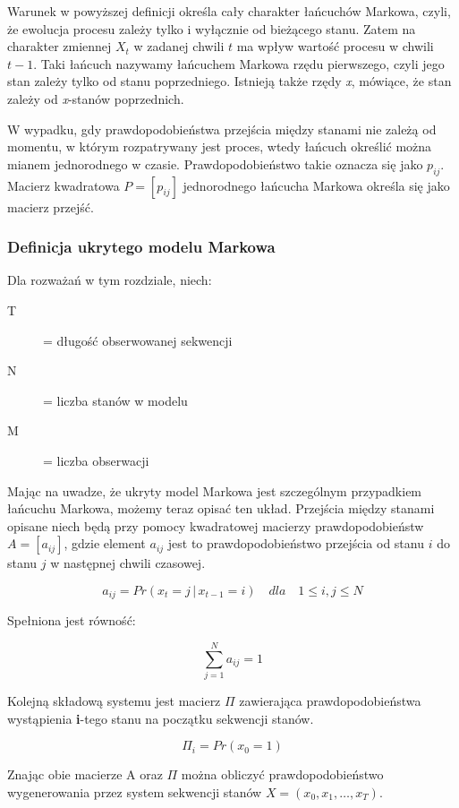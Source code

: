 Warunek w powyższej definicji określa cały charakter łańcuchów Markowa, czyli, że ewolucja procesu zależy tylko i wyłącznie od bieżącego stanu. Zatem na charakter zmiennej $X_t$ w zadanej chwili $t$ ma wpływ wartość procesu w chwili $t - 1$. Taki łańcuch nazywamy łańcuchem Markowa rzędu pierwszego, czyli jego stan zależy tylko od stanu poprzedniego. Istnieją także rzędy \textit{x}, mówiące, że stan zależy od \textit{x}-stanów poprzednich.

W wypadku, gdy prawdopodobieństwa przejścia między stanami nie zależą od momentu, w którym rozpatrywany jest proces, wtedy łańcuch określić można mianem jednorodnego w czasie. Prawdopodobieństwo takie oznacza się jako $p_{ij}$. Macierz kwadratowa $P=[p_{ij}]$ jednorodnego łańcucha Markowa określa się jako macierz przejść.

\subsubsection{Definicja ukrytego modelu Markowa}

Dla rozważań w tym rozdziale, niech:

\begin{description}
  \item[T] = długość obserwowanej sekwencji
  \item[N] = liczba stanów w modelu
  \item[M] = liczba obserwacji
\end{description}

Mając na uwadze, że ukryty model Markowa jest szczególnym przypadkiem łańcuchu Markowa, możemy teraz opisać ten układ. Przejścia między stanami opisane niech będą przy pomocy kwadratowej macierzy prawdopodobieństw $A=[a_{ij}]$, gdzie element $a_{ij}$ jest to prawdopodobieństwo przejścia od stanu $i$ do stanu $j$ w następnej chwili czasowej.

$$ a_{ij}=Pr(x_{t}=j\,|\,x_{t-1}=i) \quad dla \quad 1 \leq i,j \leq N $$

Spełniona jest równość:

$$ \sum_{j=1}^{N} a_{ij} = 1 $$

\newpage

Kolejną składową systemu jest macierz $\Pi$ zawierająca prawdopodobieństwa wystąpienia \textbf{i}-tego stanu na początku sekwencji stanów.

$$ \Pi_{i} = Pr(x_{0}=1) $$

Znając obie macierze A oraz $\Pi$ można obliczyć prawdopodobieństwo wygenerowania przez system sekwencji stanów $X=(x_{0},x_{1}, \dots, x_{T})$.

